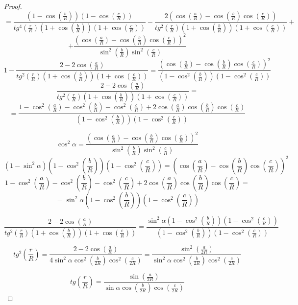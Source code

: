 \documentclass[12pt]{article}
\theoremstyle{plain}
\begin{document}
\begin{proof}
        $$=\frac{\left(1-\cos\left(\frac{b}{R}\right)\right)\left(1-\cos\left(\frac{c}{R}\right)\right)}{tg^4\left(\frac{r}{R}\right)\left(1+\cos\left(\frac{b}{R}\right)\right)\left(1+\cos\left(\frac{c}{R}\right)\right)}-\frac{2\left(\cos\left(\frac{a}{R}\right)-\cos\left(\frac{b}{R}\right)\cos\left(\frac{c}{R}\right)\right)}{tg^2\left(\frac{r}{R}\right)\left(1+\cos\left(\frac{b}{R}\right)\right)\left(1+\cos\left(\frac{c}{R}\right)\right)}+$$
        $$+\frac{\left(\cos\left(\frac{a}{R}\right)-\cos\left(\frac{b}{R}\right)\cos\left(\frac{c}{R}\right)\right)^2}{\sin^2\left(\frac{b}{R}\right)\sin^2\left(\frac{c}{R}\right)}$$
        $$1-\frac{2-2\cos\left(\frac{a}{R}\right)}{tg^2\left(\frac{r}{R}\right)\left(1+\cos\left(\frac{b}{R}\right)\right)\left(1+\cos\left(\frac{c}{R}\right)\right)}=\frac{\left(\cos\left(\frac{a}{R}\right)-\cos\left(\frac{b}{R}\right)\cos\left(\frac{c}{R}\right)\right)^2}{\left(1-\cos^2\left(\frac{b}{R}\right)\right)\left(1-\cos^2\left(\frac{c}{R}\right)\right)}$$
        $$\frac{2-2\cos\left(\frac{a}{R}\right)}{tg^2\left(\frac{r}{R}\right)\left(1+\cos\left(\frac{b}{R}\right)\right)\left(1+\cos\left(\frac{c}{R}\right)\right)}=$$
        $$=\frac{1-\cos^2\left(\frac{a}{R}\right)-\cos^2\left(\frac{b}{R}\right)-\cos^2\left(\frac{c}{R}\right)+2\cos\left(\frac{a}{R}\right)\cos\left(\frac{b}{R}\right)\cos\left(\frac{c}{R}\right)}{\left(1-\cos^2\left(\frac{b}{R}\right)\right)\left(1-\cos^2\left(\frac{c}{R}\right)\right)}$$

        $$\cos^2\alpha=\frac{\left(\cos\left(\frac{a}{R}\right)-\cos\left(\frac{b}{R}\right)\cos\left(\frac{c}{R}\right)\right)^2}{\sin^2\left(\frac{b}{R}\right)\sin^2\left(\frac{c}{R}\right)}$$
        $$\left(1-\sin^2\alpha\right)\left(1-\cos^2\left(\frac{b}{R}\right)\right)\left(1-\cos^2\left(\frac{c}{R}\right)\right)=\left(\cos\left(\frac{a}{R}\right)-\cos\left(\frac{b}{R}\right)\cos\left(\frac{c}{R}\right)\right)^2$$
        $$1-\cos^2\left(\frac{a}{R}\right)-\cos^2\left(\frac{b}{R}\right)-\cos^2\left(\frac{c}{R}\right)+2\cos\left(\frac{a}{R}\right)\cos\left(\frac{b}{R}\right)\cos\left(\frac{c}{R}\right)=$$
        $$=\sin^2\alpha\left(1-\cos^2\left(\frac{b}{R}\right)\right)\left(1-\cos^2\left(\frac{c}{R}\right)\right)$$

        $$\frac{2-2\cos\left(\frac{a}{R}\right)}{tg^2\left(\frac{r}{R}\right)\left(1+\cos\left(\frac{b}{R}\right)\right)\left(1+\cos\left(\frac{c}{R}\right)\right)}=\frac{\sin^2\alpha\left(1-\cos^2\left(\frac{b}{R}\right)\right)\left(1-\cos^2\left(\frac{c}{R}\right)\right)}{\left(1-\cos^2\left(\frac{b}{R}\right)\right)\left(1-\cos^2\left(\frac{c}{R}\right)\right)}$$
        
        $$tg^2\left(\frac{r}{R}\right)=\frac{2-2\cos\left(\frac{a}{R}\right)}{4\sin^2\alpha\cos^2\left(\frac{b}{2R}\right)\cos^2\left(\frac{c}{2R}\right)}=\frac{\sin^2\left(\frac{a}{2R}\right)}{\sin^2\alpha\cos^2\left(\frac{b}{2R}\right)\cos^2\left(\frac{c}{2R}\right)}$$

        $$tg\left(\frac{r}{R}\right)=\frac{\sin\left(\frac{a}{2R}\right)}{\sin\alpha\cos\left(\frac{b}{2R}\right)\cos\left(\frac{c}{2R}\right)}$$
        
    \end{proof}
\end{document}
